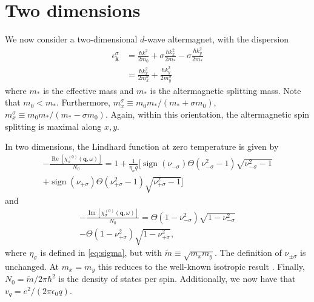 \documentclass[aps,prb,reprint,twocolumns,superscriptaddress,nofootinbib]{revtex4-2}
\DeclareMathOperator{\sign}{sign}
\DeclareMathOperator{\Imm}{Im}
\DeclareMathOperator{\Ree}{Re}
\newcommand{\mdos}{\tilde{m}}
\begin{document}
	\section{Two dimensions}
	We now consider a two-dimensional $d$-wave altermagnet, with the dispersion
	\begin{align}
		\epsilon_{\bm k}^\sigma &= \frac{\hbar k^2}{2m_0} + \sigma \frac{\hbar k_x^2}{2m_*} - \sigma \frac{\hbar k_y^2}{2m_*} \\
		&=\frac{\hbar k_x^2}{2m_x^\sigma}+ \frac{\hbar k_y^2}{2m_y^\sigma}
	\end{align}
	where $m_*$ is the effective mass and $m_*$ is the altermagnetic splitting mass. Note that $m_0<m_*$. Furthermore, $m_x^\sigma\equiv m_0 m_* / (m_*+\sigma m_0)$, $m_x^\sigma\equiv m_0 m_* / (m_*-\sigma m_0)$. Again, within this orientation, the altermagnetic spin splitting is maximal along $x,y$.
	
	In two dimensions, the Lindhard function at zero temperature is given by \cite{ahnAnisotropicFermionicQuasiparticles2021}
	\begin{multline}
		-\frac{\Ree[\chi_\sigma^{(0)} (\bm q,\omega) ]}{N_0 }= 1 + \frac{1}{\eta_\sigma \bar q} \bigg[\sign(\nu_{-\sigma}) \Theta(\nu_{-\sigma}^2-1)\sqrt{\nu_{-\sigma}^2-1}\\+\sign(\nu_{+\sigma}) \Theta(\nu_{+\sigma}^2-1)\sqrt{\nu_{+\sigma}^2-1}\bigg]
	\end{multline}
	and 
	\begin{multline}
		-\frac{\Imm[\chi_\sigma^{(0)} (\bm q,\omega) ]}{ N_0}=\Theta(1-\nu_{-\sigma}^2)\sqrt{1-\nu_{-\sigma}^2}\\-\Theta(1-\nu_{+\sigma}^2)\sqrt{1-\nu_{+\sigma}^2},
	\end{multline}
	where $\eta_\sigma$ is defined in \cref{eq:sigma}, but with
	$\mdos\equiv \sqrt{m_xm_y}$. The definition of $\nu_{\pm\sigma}$ is unchanged. At $m_x=m_y$ this reduces to the well-known isotropic result \cite{giulianiQuantumTheoryElectron2005}. Finally, $N_0=\mdos/2\pi\hbar^2$ is the density of states per spin.
	Additionally, we now have that $v_q=e^2/(2\pi\epsilon_0 q)$.
	
	
	
\end{document}

